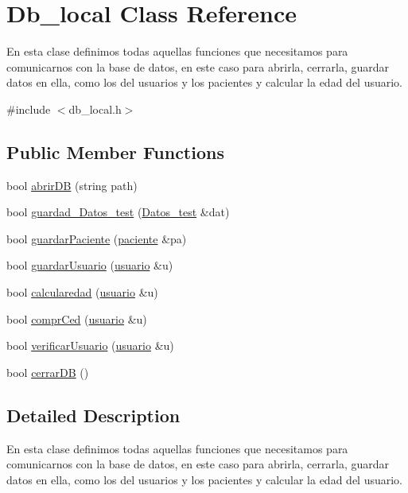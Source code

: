 \hypertarget{class_db__local}{}\section{Db\+\_\+local Class Reference}
\label{class_db__local}


En esta clase definimos todas aquellas funciones que necesitamos para comunicarnos con la base de datos, en este caso para abrirla, cerrarla, guardar datos en ella, como los del usuarios y los pacientes y calcular la edad del usuario.  




{\ttfamily \#include $<$db\+\_\+local.\+h$>$}

\subsection*{Public Member Functions}
\begin{DoxyCompactItemize}
\item 
bool \hyperlink{class_db__local_ab36977bb84cdf4484db434e9d84403c6}{abrir\+DB} (string path)
\item 
bool \hyperlink{class_db__local_a198c494ca161235dae8e6fb5a1219034}{guardad\+\_\+\+Datos\+\_\+test} (\hyperlink{class_datos__test}{Datos\+\_\+test} \&dat)
\item 
bool \hyperlink{class_db__local_a21d574f5ecec89adf7f2fc8735862eca}{guardar\+Paciente} (\hyperlink{classpaciente}{paciente} \&pa)
\item 
bool \hyperlink{class_db__local_a4e9a7db9c77ac8792f83dbf24f55fce4}{guardar\+Usuario} (\hyperlink{classusuario}{usuario} \&u)
\item 
bool \hyperlink{class_db__local_aae39c7614d35aadf4e575368b078364f}{calcularedad} (\hyperlink{classusuario}{usuario} \&u)
\item 
bool \hyperlink{class_db__local_a7ae3a56bdf45122af6dc7e15f01cc7c9}{compr\+Ced} (\hyperlink{classusuario}{usuario} \&u)
\item 
bool \hyperlink{class_db__local_aa2a0ccc915239506dd8c00a2da864fb6}{verificar\+Usuario} (\hyperlink{classusuario}{usuario} \&u)
\item 
bool \hyperlink{class_db__local_adb458d3fdb74eeb44ff839b6b8425343}{cerrar\+DB} ()
\end{DoxyCompactItemize}


\subsection{Detailed Description}
En esta clase definimos todas aquellas funciones que necesitamos para comunicarnos con la base de datos, en este caso para abrirla, cerrarla, guardar datos en ella, como los del usuarios y los pacientes y calcular la edad del usuario. 

